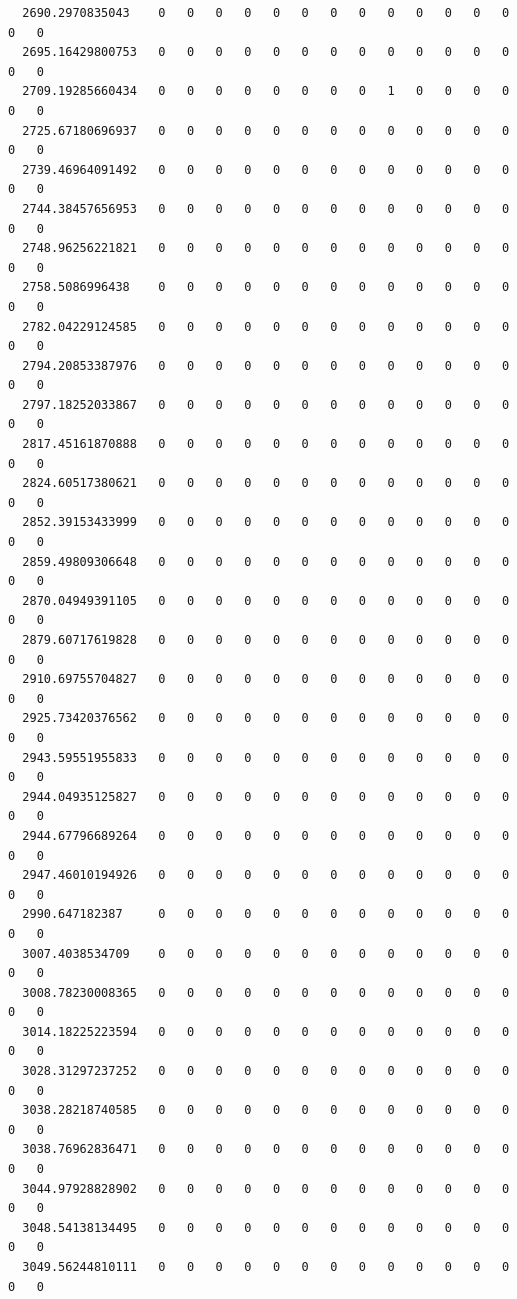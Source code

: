 \documentclass[
  letterpaper,
  DIV=11,
  numbers=noendperiod]{scrartcl}
\begin{document}
\begin{verbatim}
  2690.2970835043    0   0   0   0   0   0   0   0   0   0   0   0   0   0   0
  2695.16429800753   0   0   0   0   0   0   0   0   0   0   0   0   0   0   0
  2709.19285660434   0   0   0   0   0   0   0   0   1   0   0   0   0   0   0
  2725.67180696937   0   0   0   0   0   0   0   0   0   0   0   0   0   0   0
  2739.46964091492   0   0   0   0   0   0   0   0   0   0   0   0   0   0   0
  2744.38457656953   0   0   0   0   0   0   0   0   0   0   0   0   0   0   0
  2748.96256221821   0   0   0   0   0   0   0   0   0   0   0   0   0   0   0
  2758.5086996438    0   0   0   0   0   0   0   0   0   0   0   0   0   0   0
  2782.04229124585   0   0   0   0   0   0   0   0   0   0   0   0   0   0   0
  2794.20853387976   0   0   0   0   0   0   0   0   0   0   0   0   0   0   0
  2797.18252033867   0   0   0   0   0   0   0   0   0   0   0   0   0   0   0
  2817.45161870888   0   0   0   0   0   0   0   0   0   0   0   0   0   0   0
  2824.60517380621   0   0   0   0   0   0   0   0   0   0   0   0   0   0   0
  2852.39153433999   0   0   0   0   0   0   0   0   0   0   0   0   0   0   0
  2859.49809306648   0   0   0   0   0   0   0   0   0   0   0   0   0   0   0
  2870.04949391105   0   0   0   0   0   0   0   0   0   0   0   0   0   0   0
  2879.60717619828   0   0   0   0   0   0   0   0   0   0   0   0   0   0   0
  2910.69755704827   0   0   0   0   0   0   0   0   0   0   0   0   0   0   0
  2925.73420376562   0   0   0   0   0   0   0   0   0   0   0   0   0   0   0
  2943.59551955833   0   0   0   0   0   0   0   0   0   0   0   0   0   0   0
  2944.04935125827   0   0   0   0   0   0   0   0   0   0   0   0   0   0   0
  2944.67796689264   0   0   0   0   0   0   0   0   0   0   0   0   0   0   0
  2947.46010194926   0   0   0   0   0   0   0   0   0   0   0   0   0   0   0
  2990.647182387     0   0   0   0   0   0   0   0   0   0   0   0   0   0   0
  3007.4038534709    0   0   0   0   0   0   0   0   0   0   0   0   0   0   0
  3008.78230008365   0   0   0   0   0   0   0   0   0   0   0   0   0   0   0
  3014.18225223594   0   0   0   0   0   0   0   0   0   0   0   0   0   0   0
  3028.31297237252   0   0   0   0   0   0   0   0   0   0   0   0   0   0   0
  3038.28218740585   0   0   0   0   0   0   0   0   0   0   0   0   0   0   0
  3038.76962836471   0   0   0   0   0   0   0   0   0   0   0   0   0   0   0
  3044.97928828902   0   0   0   0   0   0   0   0   0   0   0   0   0   0   0
  3048.54138134495   0   0   0   0   0   0   0   0   0   0   0   0   0   0   0
  3049.56244810111   0   0   0   0   0   0   0   0   0   0   0   0   0   0   0

\end{verbatim}
\end{document}
